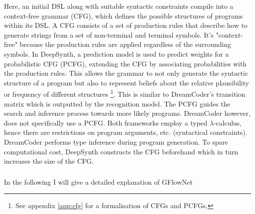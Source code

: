 Here, an initial DSL along with suitable syntactic constraints compile into a context-free grammar (CFG), which defines the possible structures of programs within its DSL. A CFG consists of a set of production rules that describe how to generate strings from a set of non-terminal and terminal symbols. It's "context-free" because the production rules are applied regardless of the surrounding symbols.
In DeepSynth, a prediction model is used to predict weights for a probabilistic CFG (PCFG), extending the CFG by associating probabilities with the production rules. This allows the grammar to not only generate the syntactic structure of a program but also to represent beliefs about the relative plausibility or frequency of different structures \footnote{See appendix \ref{app:cfg} for a formalisation of CFGs and PCFGs.}. This is similar to DreamCoder's transition matrix which is outputted by the recognition model. The PCFG guides the search and inference process towards more likely programs. DreamCoder however, does not specifically use a PCFG. Both frameworks employ a typed $\lambda$-calculus, hence there are restrictions on program arguments, etc. (syntactical constraints). DreamCoder performs type inference during program generation. To spare computational cost, DeepSynth constructs the CFG beforehand which in turn increases the size of the CFG.

\subsubsection{}\label{sec:gflownet}
In the following I will give a detailed explanation of GFlowNet

